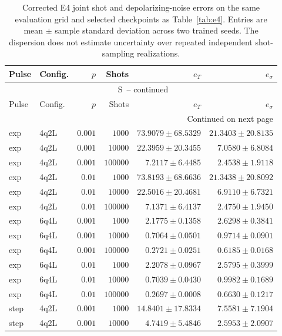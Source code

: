 \documentclass[11pt]{article}
\renewcommand{\thetable}{S\arabic{table}}
\begin{document}
\FloatBarrier
\begingroup\footnotesize
\setlength{\tabcolsep}{4pt}
\setlength{\LTcapwidth}{\textwidth}
\begin{longtable}{llrrrr}
\caption{Corrected E4 joint shot and depolarizing-noise errors on the same evaluation grid and selected checkpoints as Table~\ref{tab:e4}. Entries are mean $\pm$ sample standard deviation across two trained seeds. The dispersion does not estimate uncertainty over repeated independent shot-sampling realizations.}\label{tab:e4joint}\\
\toprule
Pulse & Config. & $p$ & Shots & $e_T$ & $e_\sigma$ \\
\midrule
\endfirsthead
\multicolumn{6}{c}{\tablename\ \thetable\ -- continued}\\
\toprule
Pulse & Config. & $p$ & Shots & $e_T$ & $e_\sigma$ \\
\midrule
\endhead
\midrule
\multicolumn{6}{r}{Continued on next page}\\
\endfoot
\bottomrule
\endlastfoot
exp & 4q2L & $0.001$ & $1000$ & $73.9079\pm68.5329$ & $21.3403\pm20.8135$ \\
exp & 4q2L & $0.001$ & $10000$ & $22.3959\pm20.3455$ & $7.0580\pm6.8084$ \\
exp & 4q2L & $0.001$ & $100000$ & $7.2117\pm6.4485$ & $2.4538\pm1.9118$ \\
exp & 4q2L & $0.01$ & $1000$ & $73.8193\pm68.6636$ & $21.3438\pm20.8092$ \\
exp & 4q2L & $0.01$ & $10000$ & $22.5016\pm20.4681$ & $6.9110\pm6.7321$ \\
exp & 4q2L & $0.01$ & $100000$ & $7.1371\pm6.4137$ & $2.4750\pm1.9450$ \\
\midrule
exp & 6q4L & $0.001$ & $1000$ & $2.1775\pm0.1358$ & $2.6298\pm0.3841$ \\
exp & 6q4L & $0.001$ & $10000$ & $0.7064\pm0.0501$ & $0.9714\pm0.0901$ \\
exp & 6q4L & $0.001$ & $100000$ & $0.2721\pm0.0251$ & $0.6185\pm0.0168$ \\
exp & 6q4L & $0.01$ & $1000$ & $2.2078\pm0.0967$ & $2.5795\pm0.3999$ \\
exp & 6q4L & $0.01$ & $10000$ & $0.7039\pm0.0430$ & $0.9982\pm0.1689$ \\
exp & 6q4L & $0.01$ & $100000$ & $0.2697\pm0.0008$ & $0.6630\pm0.1217$ \\
\midrule
step & 4q2L & $0.001$ & $1000$ & $14.8401\pm17.8334$ & $7.5581\pm7.1904$ \\
step & 4q2L & $0.001$ & $10000$ & $4.7419\pm5.4846$ & $2.5953\pm2.0907$ \\

\end{longtable}
\end{document}

